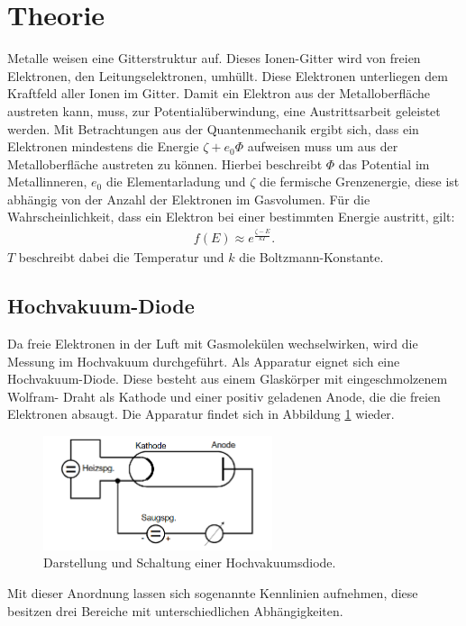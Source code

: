 \section{Theorie}
\label{sec:Theorie}
Metalle weisen eine Gitterstruktur auf. Dieses Ionen-Gitter wird von freien Elektronen, den Leitungselektronen,
umhüllt. Diese Elektronen unterliegen dem Kraftfeld aller Ionen im Gitter.
Damit ein Elektron aus der Metalloberfläche austreten kann, muss, zur Potentialüberwindung, eine
Austrittsarbeit geleistet werden. Mit Betrachtungen aus der Quantenmechanik ergibt sich, dass
ein Elektronen mindestens die Energie $\zeta+e_\mathrm{0}\Phi$ aufweisen muss um aus der Metalloberfläche
austreten zu können. Hierbei beschreibt $\Phi$ das Potential im Metallinneren, $e_\mathrm{0}$ die Elementarladung
und $\zeta$ die fermische Grenzenergie, diese ist abhängig
von der Anzahl der Elektronen im Gasvolumen.
Für die Wahrscheinlichkeit, dass ein Elektron bei einer bestimmten Energie austritt, gilt:
\begin{align}
f(E)\approx e^{\frac{\zeta-E}{kT}}\label{eqn:naeherung}.
\end{align}
$T$ beschreibt dabei die Temperatur und $k$ die Boltzmann-Konstante.

\subsection{Hochvakuum-Diode}
Da freie Elektronen in der Luft mit Gasmolekülen wechselwirken, wird die Messung im Hochvakuum durchgeführt.
Als Apparatur eignet sich eine Hochvakuum-Diode. Diese besteht aus einem Glaskörper mit eingeschmolzenem Wolfram-
Draht als Kathode und einer positiv geladenen Anode, die die freien Elektronen absaugt.
Die Apparatur findet sich in Abbildung \ref{fig:aufbau} wieder.
\begin{figure}
 \centering
 \includegraphics[width=0.6\textwidth]{aufbau.png}
 \caption{Darstellung und Schaltung einer Hochvakuumsdiode.\cite{sample}}
 \label{fig:aufbau}
 \end{figure}
 Mit dieser Anordnung lassen sich sogenannte Kennlinien aufnehmen, diese besitzen drei Bereiche mit unterschiedlichen Abhängigkeiten.


